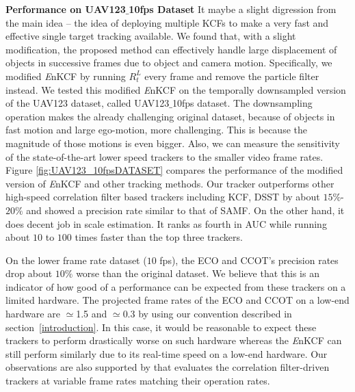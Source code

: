 \documentclass[10pt,twocolumn,letterpaper]{article}
\begin{document}
\textbf{Performance on UAV123$\_$10fps Dataset} It maybe a slight
digression from the main idea -- the idea of deploying multiple KCFs
to make a very fast and effective single target tracking
available. We found that, with a slight modification, the proposed
method can effectively handle large displacement of objects in successive frames due to object
and camera motion. Specifically, we modified {\it E}nKCF by running
$R_{t}^{L}$ every frame and remove the particle filter instead. We
tested this modified {\it E}nKCF on the temporally downsampled version of the UAV123 dataset, called 
UAV123$\_$10fps dataset. The downsampling operation makes the already challenging original dataset, 
because of objects in fast motion and large ego-motion, more challenging. This is because the magnitude
of those motions is even bigger. Also, we can measure the sensitivity of 
the state-of-the-art lower speed trackers to the smaller video frame rates. 
Figure \ref{fig:UAV123_10fpsDATASET} compares the performance of the modified version of {\it E}nKCF and
other tracking methods. Our tracker outperforms other high-speed
correlation filter based trackers including KCF, DSST by about
$15\%$-$20\%$ and showed a precision rate similar to that of SAMF. On
the other hand, it does decent job in scale estimation. It ranks as
fourth in AUC while running about $10$ to $100$ times faster than the top three trackers.

On the lower frame rate dataset ($10$ fps), the ECO and CCOT's precision rates drop about
$10\%$ worse than the original dataset. We believe that this is an indicator of
how good of a performance can be expected from these trackers on a limited hardware. The projected
frame rates of the ECO and CCOT on a low-end hardware are $\simeq$1.5 and $\simeq$0.3 by using our 
convention described in section~\ref{introduction}. In this case, it would be reasonable to expect these
trackers to perform drastically worse on such hardware whereas the {\it E}nKCF can still perform similarly
due to its real-time speed on a low-end hardware. Our observations are also supported by \cite{mueller2017context}
that evaluates the correlation filter-driven trackers at variable frame rates matching their operation rates.
\end{document}
